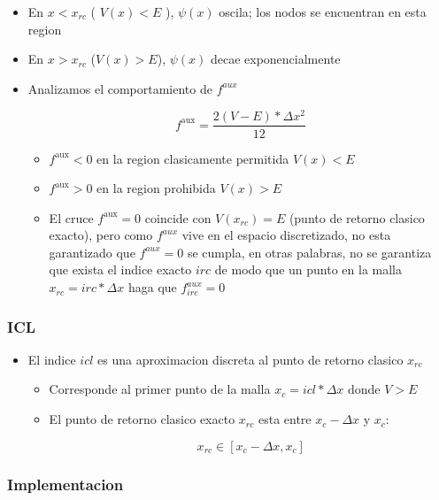 \documentclass[11pt]{article}
\begin{document}
\begin{itemize}
\item En \(x < x_{rc}\) ( \(V(x) < E\) ), \(\psi(x)\) oscila; los nodos se encuentran en esta region

\item En \(x> x_{rc}\) (\(V(x) > E\)), \(\psi(x)\) decae exponencialmente

\item Analizamos el comportamiento de \(f^{aux}\)

\[ f^{\text{aux}} = \frac{2(V-E) * \Delta x^2}{12} \]

\begin{itemize}
\item \(f^{\text{aux}} < 0\) en la region clasicamente permitida \(V(x)<E\)

\item \(f^{\text{aux}} > 0\) en la region prohibida \(V(x) > E\)

\item El cruce \(f^{\text{aux}} = 0\) coincide con \(V(x_{rc}) = E\) (punto de retorno clasico exacto), pero como \(f^{aux}\) vive en el espacio discretizado, no esta garantizado que \(f^{aux} = 0\) se cumpla, en otras palabras, no se garantiza que exista el indice exacto \(irc\) de modo que un punto en la malla \(x_{rc} = irc*\Delta x\) haga que \(f_{irc}^{aux} = 0\)
\end{itemize}
\end{itemize}
\subsubsection{ICL}
\label{sec:org45a925a}

\begin{itemize}
\item El indice \(icl\) es una aproximacion discreta al punto de retorno clasico \(x_{rc}\)

\begin{itemize}
\item Corresponde al primer punto de la malla \(x_c = icl * \Delta x\) donde \(V > E\)

\item El punto de retorno clasico exacto \(x_{rc}\) esta entre \(x_c - \Delta x\) y \(x_c\):

\[ x_{rc} \in [x_c-\Delta x, x_c] \]
\end{itemize}
\end{itemize}
\subsubsection{Implementacion}
\label{sec:org2d5772e}
\end{document}
